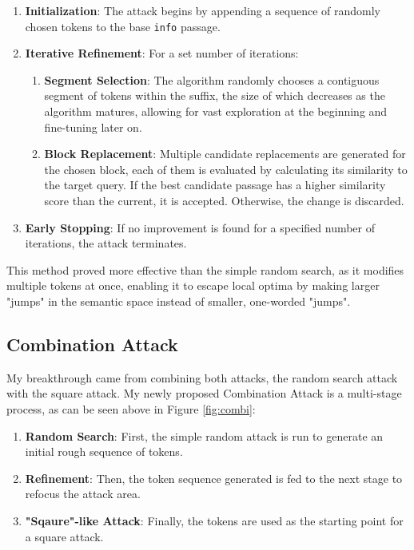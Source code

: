 \documentclass[a4paper, sigconf]{acmart}
\begin{document}
\begin{enumerate}
  \item \textbf{Initialization}: The attack begins by appending a sequence of randomly chosen tokens to the base \texttt{info} passage. 
  \item \textbf{Iterative Refinement}: For a set number of iterations: 
  \begin{enumerate}
    \item \textbf{Segment Selection}: The algorithm randomly chooses a contiguous segment of tokens within the suffix, the size of which decreases as the algorithm matures, allowing for vast exploration at the beginning and fine-tuning later on. 
    \item \textbf{Block Replacement}: Multiple candidate replacements are generated for the chosen block, each of them is evaluated by calculating its similarity to the target query. If the best candidate passage has a higher similarity score than the current, it is accepted. Otherwise, the change is discarded. 
  \end{enumerate}
  \item \textbf{Early Stopping}: If no improvement is found for a specified number of iterations, the attack terminates.
\end{enumerate}
 
This method proved more effective than the simple random search, as it modifies multiple tokens at once, enabling it to escape local optima by making larger "jumps" in the semantic space instead of smaller, one-worded "jumps". 


\subsection{Combination Attack}

My breakthrough came from combining both attacks, the random search attack with the square attack. My newly proposed Combination Attack is a multi-stage process, as can be seen above in Figure \ref{fig:combi}:

\begin{enumerate}
  \item \textbf{Random Search}: First, the simple random attack is run to generate an initial rough sequence of tokens. 
  \item \textbf{Refinement}: Then, the token sequence generated is fed to the next stage to refocus the attack area.
  \item \textbf{"Sqaure"-like Attack}: Finally, the tokens are used as the starting point for a square attack.
\end{enumerate}
\end{document}
